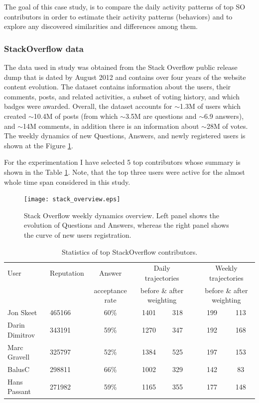 The goal of this case study, is to compare the daily activity patterns of top SO contributors in order to estimate their activity patterns (behaviors) and to explore any discovered similarities and differences among them. 

\subsubsection{StackOverflow data}
The data used in study was obtained from the Stack Overflow public release dump that is dated by August 2012 and contains over four years of the website content evolution. The dataset contains information about the users, their comments, posts, and related activities, a subset of voting history, and which badges were awarded.  Overall, the dataset accounts for $\sim$1.3M of users which created $\sim$10.4M of posts (from which $\sim$3.5M are questions and $\sim$6.9 answers), and $\sim$14M comments, in addition there is an information about $\sim$28M of votes. The weekly dynamics of new Questions, Answers, and newly registered users is shown at the Figure \ref{fig:stack_dynamics}.

For the experimentation I have selected 5 top contributors whose summary is shown in the Table \ref{so_table}. Note, that the top three users were active for the almost whole time span considered in this study.

\begin{figure}
\centering
\texttt{[image: stack\_overview.eps]}
\caption{Stack Overflow weekly dynamics overview. Left panel shows the evolution of Questions and Answers, whereas the right panel shows the curve of new users registration.}
\label{fig:stack_dynamics}   
\end{figure}

\begin{table}[]
\begin{small}
\begin{tabularx}{\linewidth}{l X c c c c c c}
\toprule
User   & Reputation   &   Answer & \multicolumn{2}{c}{Daily  trajectories} & & \multicolumn{2}{c}{Weekly trajectories}\\
& & acceptance rate & \multicolumn{2}{c}{before \& after weighting} & & \multicolumn{2}{c}{before \& after weighting}\\
\midrule
Jon Skeet   & 465166 & 60\% &1401 & 318 & \qquad & 199 & 113 \\
Darin Dimitrov   &  343191 & 59\% & 1270  & 347 & &192 & 168\\
Marc Gravell & 325797 & 52\%  &1384 &525 & &197 & 153 \\
BalusC  & 298811 & 66\% &1002 &329 & &142 & 83 \\
Hans Passant & 271982 & 59\% &1165    &355 & &177 & 148\\
\bottomrule
\end{tabularx}
\caption{Statistics of top StackOverflow contributors.}
\label{so_table}
\end{small}
\end{table}

